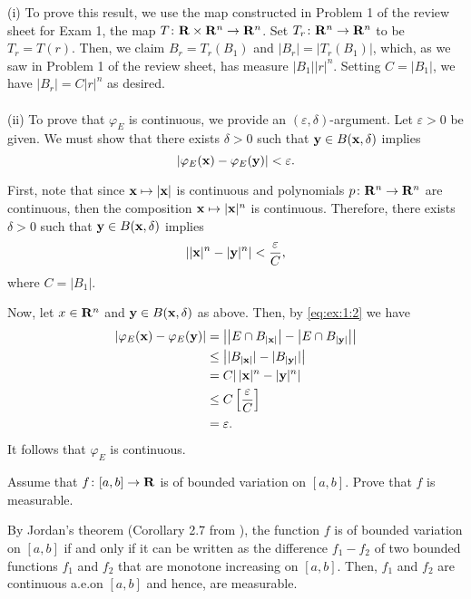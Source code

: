 \begin{solution}
(i) To prove this result, we use the map constructed in Problem 1 of the
review sheet for Exam 1, the map $T\colon\mathbf{R}\times\mathbf{R}^n\to\mathbf{R}^n$. Set
$T_r\colon\mathbf{R}^n\to\mathbf{R}^n$ to be $T_r= T(r)$. Then, we claim
$B_r=T_r(B_1)$ and $|B_r|=|T_r(B_1)|$, which, as we saw in Problem 1 of the
review sheet, has measure $|B_1||r|^n$. Setting $C= |B_1|$, we have
$|B_r|=C|r|^n$ as desired.
\\\\
(ii) To prove that $\varphi_E$ is continuous, we provide an
$(\varepsilon,\delta)$-argument. Let $\varepsilon>0$ be given. We must show
that there exists $\delta>0$ such that $\mathbf{y}\in B(\mathbf{x},\delta)$ implies
\begin{equation}
\label{eq:ex:1:1}
\left|\varphi_E(\mathbf{x})-\varphi_E(\mathbf{y})\right|<\varepsilon.
\end{equation}

First, note that since $\mathbf{x}\mapsto |\mathbf{x}|$ is continuous and polynomials
$p\colon\mathbf{R}^n\to\mathbf{R}^n$ are continuous, then the composition
$\mathbf{x}\mapsto|\mathbf{x}|^n$ is continuous. Therefore, there exists $\delta>0$
such that $\mathbf{y}\in B(\mathbf{x},\delta)$ implies
\begin{equation}
\label{eq:ex:1:2}
\left||\mathbf{x}|^n-|\mathbf{y}|^n\right|<\frac{\varepsilon}{C},
\end{equation}
where $C= |B_1|$.

Now, let $x\in\mathbf{R}^n$ and $\mathbf{y}\in B(\mathbf{x},\delta)$ as above. Then, by
\eqref{eq:ex:1:2} we have
\begin{equation}
\label{eq:ex:1:3}
\begin{aligned}
\left|\varphi_E(\mathbf{x})-\varphi_E(\mathbf{y})\right|
&=\left|
\left|E\cap B_{|\mathbf{x}|}\right|
-
\left|E\cap B_{|\mathbf{y}|}\right|
\right|\\
&\leq\left| |B_{|\mathbf{x}|}|-|B_{|\mathbf{y}|}|\right|\\
&=C|\left|\mathbf{x}|^n-|\mathbf{y}|^n\right|\\
&\leq C\left[\frac{\varepsilon}{C}\right]\\
&=\varepsilon.
\end{aligned}
\end{equation}
It follows that $\varphi_E$ is continuous.
\end{solution}

\begin{problem}
Assume that $f\colon[a,b]\to\mathbf{R}$ is of bounded variation on $[a,b]$. Prove
that $f$ is measurable.
\end{problem}
\begin{solution}
By Jordan's theorem (Corollary 2.7 from \cite[Ch.\@ 2, p.\@
21]{wheeden-zygmund}), the function $f$ is of bounded variation on $[a,b]$
if and only if it can be written as the difference $f_1-f_2$ of two bounded
functions $f_1$ and $f_2$ that are monotone increasing on $[a,b]$. Then,
$f_1$ and $f_2$ are continuous a.e.\@ on $[a,b]$ and hence, are
measurable.
\end{solution}

